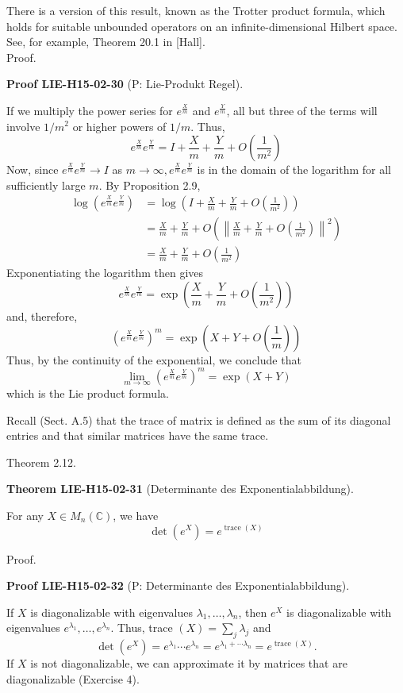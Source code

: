 \documentclass[10pt, letterpaper]{article}
\newcommand{\CustomHeading}[3]{%
  \par\medskip\noindent%
  \textbf{#1 #2} \textnormal{(#3)}.\enskip%
}
\newenvironment{THEO}[2]{\begin{unitbox}\CustomHeading{Theorem}{#1}{#2}}{\end{unitbox}}
\newenvironment{PROOF}[2]{\begin{unitbox}\CustomHeading{Proof}{#1}{#2}}{\end{unitbox}}
\begin{document}
There is a version of this result, known as the Trotter product formula, which holds for suitable unbounded operators on an infinite-dimensional Hilbert space. See, for example, Theorem 20.1 in [Hall].\\


Proof. 


\begin{PROOF}{LIE-H15-02-30}{P: Lie-Produkt Regel}
If we multiply the power series for $e^{\frac{X}{m}}$ and $e^{\frac{Y}{m}}$, all but three of the terms will involve $1 / m^{2}$ or higher powers of $1 / m$. Thus,
$$
e^{\frac{X}{m}} e^{\frac{Y}{m}}=I+\frac{X}{m}+\frac{Y}{m}+O\left(\frac{1}{m^{2}}\right)
$$
Now, since $e^{\frac{X}{m}} e^{\frac{Y}{m}} \rightarrow I$ as $m \rightarrow \infty, e^{\frac{X}{m}} e^{\frac{Y}{m}}$ is in the domain of the logarithm for all sufficiently large $m$. By Proposition 2.9,
$$
\begin{aligned}
\log \left(e^{\frac{X}{m}} e^{\frac{Y}{m}}\right) & =\log \left(I+\frac{X}{m}+\frac{Y}{m}+O\left(\frac{1}{m^{2}}\right)\right) \\
& =\frac{X}{m}+\frac{Y}{m}+O\left(\left\|\frac{X}{m}+\frac{Y}{m}+O\left(\frac{1}{m^{2}}\right)\right\|^{2}\right) \\
& =\frac{X}{m}+\frac{Y}{m}+O\left(\frac{1}{m^{2}}\right)
\end{aligned}
$$
Exponentiating the logarithm then gives
$$
e^{\frac{X}{m}} e^{\frac{Y}{m}}=\exp \left(\frac{X}{m}+\frac{Y}{m}+O\left(\frac{1}{m^{2}}\right)\right)
$$
and, therefore,
$$
\left(e^{\frac{X}{m}} e^{\frac{Y}{m}}\right)^{m}=\exp \left(X+Y+O\left(\frac{1}{m}\right)\right)
$$
Thus, by the continuity of the exponential, we conclude that
$$
\lim _{m \rightarrow \infty}\left(e^{\frac{X}{m}} e^{\frac{Y}{m}}\right)^{m}=\exp (X+Y)
$$
which is the Lie product formula.
\end{PROOF}



Recall (Sect. A.5) that the trace of matrix is defined as the sum of its diagonal entries and that similar matrices have the same trace.

Theorem 2.12. 

\begin{THEO}{LIE-H15-02-31}{Determinante des Exponentialabbildung}
For any $X \in M_{n}(\mathbb{C})$, we have
$$
\operatorname{det}\left(e^{X}\right)=e^{\operatorname{trace}(X)}
$$
\end{THEO}

Proof. 


\begin{PROOF}{LIE-H15-02-32}{P: Determinante des Exponentialabbildung}
If $X$ is diagonalizable with eigenvalues $\lambda_{1}, \ldots, \lambda_{n}$, then $e^{X}$ is diagonalizable with eigenvalues $e^{\lambda_{1}}, \ldots, e^{\lambda_{n}}$. Thus, trace $(X)=\sum_{j} \lambda_{j}$ and
$$
\operatorname{det}\left(e^{X}\right)=e^{\lambda_{1}} \cdots e^{\lambda_{n}}=e^{\lambda_{1}+\cdots \lambda_{n}}=e^{\operatorname{trace}(X)} .
$$
If $X$ is not diagonalizable, we can approximate it by matrices that are diagonalizable (Exercise 4).
\end{PROOF}
\end{document}
